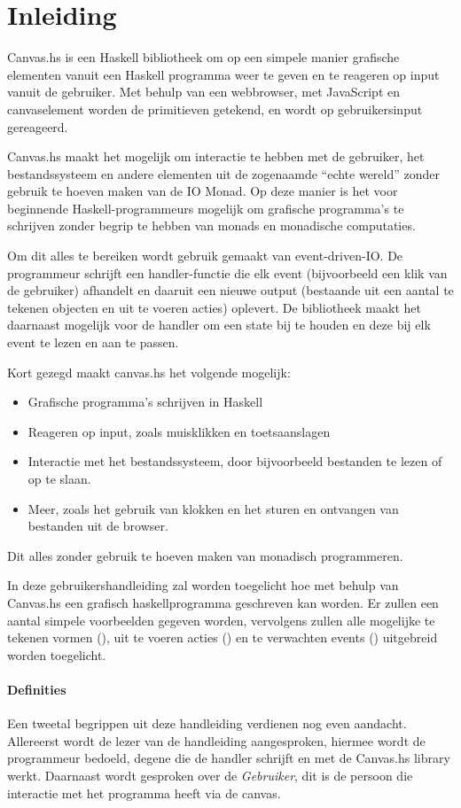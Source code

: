 \section{Inleiding}

Canvas.hs is een Haskell bibliotheek om op een simpele manier grafische elementen vanuit een Haskell programma weer te geven en te reageren op input vanuit de gebruiker. Met behulp van een webbrowser, met JavaScript en canvaselement worden de primitieven getekend, en wordt op gebruikersinput gereageerd.

Canvas.hs maakt het mogelijk om interactie te hebben met de gebruiker, het bestandssysteem en andere elementen uit de zogenaamde ``echte wereld'' zonder gebruik te hoeven maken van de IO Monad. Op deze manier is het voor beginnende Haskell-programmeurs mogelijk om grafische programma's te schrijven zonder begrip te hebben van monads en monadische computaties.

Om dit alles te bereiken wordt gebruik gemaakt van event-driven-IO. De programmeur schrijft een handler-functie die elk event (bijvoorbeeld een klik van de gebruiker) afhandelt en daaruit een nieuwe output (bestaande uit een aantal te tekenen objecten en uit te voeren acties) oplevert. De bibliotheek maakt het daarnaast mogelijk voor de handler om een state bij te houden en deze bij elk event te lezen en aan te passen. 

Kort gezegd maakt canvas.hs het volgende mogelijk:
\begin{itemize}
	\item Grafische programma's schrijven in Haskell
	\item Reageren op input, zoals muisklikken en toetsaanslagen
	\item Interactie met het bestandssysteem, door bijvoorbeeld bestanden te lezen of op te slaan.
	\item Meer, zoals het gebruik van klokken en het sturen en ontvangen van bestanden uit de browser.
\end{itemize}
Dit alles zonder gebruik te hoeven maken van monadisch programmeren. 

In deze gebruikershandleiding zal worden toegelicht hoe met behulp van Canvas.hs een grafisch haskellprogramma geschreven kan worden. Er zullen een aantal simpele voorbeelden gegeven worden, vervolgens zullen alle mogelijke te tekenen vormen (\shapes), uit te voeren acties (\actions) en te verwachten events (\events) uitgebreid worden toegelicht. 

\paragraph{Definities}
Een tweetal begrippen uit deze handleiding verdienen nog even aandacht. Allereerst wordt de lezer van de handleiding aangesproken, hiermee wordt de programmeur bedoeld, degene die de handler schrijft en met de Canvas.hs library werkt. Daarnaast wordt gesproken over de \emph{Gebruiker}, dit is de persoon die interactie met het programma heeft via de canvas.
